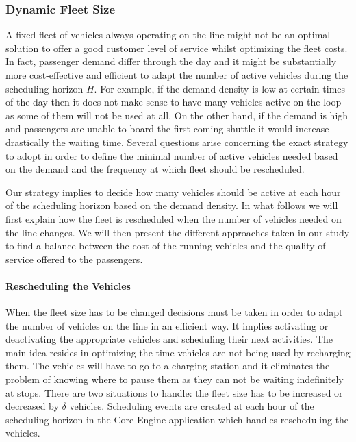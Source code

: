 \documentclass[12pt,a4paper]{article}
\begin{document}
\subsubsection{Dynamic Fleet Size}
A fixed fleet of vehicles always operating on the line might not be an optimal solution to offer a good customer level of service whilst optimizing the fleet costs. In fact, passenger demand differ through the day and it might be substantially more cost-effective and efficient to adapt the number of active vehicles during the scheduling horizon $H$. For example, if the demand density is low at certain times of the day then it does not make sense to have many vehicles active on the loop as some of them will not be used at all. On the other hand, if the demand is high and passengers are unable to board the first coming shuttle it would increase drastically the waiting time. Several questions arise concerning the exact strategy to adopt in order to define the minimal number of active vehicles needed based on the demand and the frequency at which fleet should be rescheduled. 

Our strategy implies to decide how many vehicles should be active at each hour of the scheduling horizon based on the demand density. In what follows we will first explain how the fleet is rescheduled when the number of vehicles needed on the line changes. We will then present the different approaches taken in our study to find a balance between the cost of the running vehicles and the quality of service offered to the passengers. 

\paragraph{Rescheduling the Vehicles} When the fleet size has to be changed decisions must be taken in order to adapt the number of vehicles on the line in an efficient way. It implies activating or deactivating the appropriate vehicles and scheduling their next activities. The main idea resides in optimizing the time vehicles are not being used by recharging them. The vehicles will have to go to a charging station and it eliminates the problem of knowing where to pause them as they can not be waiting indefinitely at stops. There are two situations to handle: the fleet size has to be increased or decreased by $\delta$ vehicles. Scheduling events are created at each hour of the scheduling horizon in the Core-Engine application which handles rescheduling the vehicles.
\end{document}
